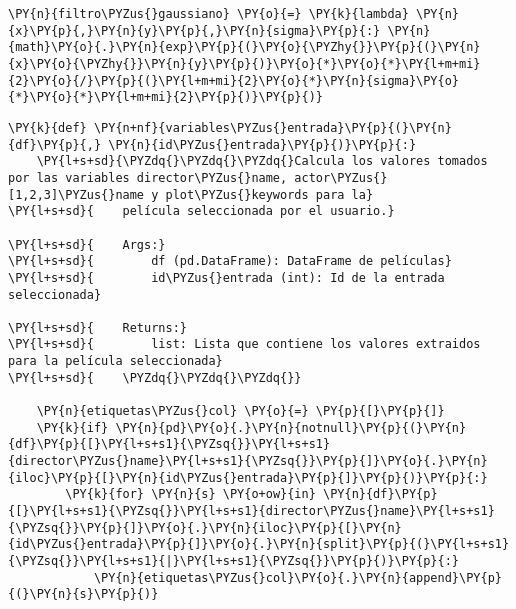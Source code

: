     \begin{tcolorbox}[breakable, size=fbox, boxrule=1pt, pad at break*=1mm,colback=cellbackground, colframe=cellborder]
\begin{Verbatim}[commandchars=\\\{\}]
\PY{n}{filtro\PYZus{}gaussiano} \PY{o}{=} \PY{k}{lambda} \PY{n}{x}\PY{p}{,}\PY{n}{y}\PY{p}{,}\PY{n}{sigma}\PY{p}{:} \PY{n}{math}\PY{o}{.}\PY{n}{exp}\PY{p}{(}\PY{o}{\PYZhy{}}\PY{p}{(}\PY{n}{x}\PY{o}{\PYZhy{}}\PY{n}{y}\PY{p}{)}\PY{o}{*}\PY{o}{*}\PY{l+m+mi}{2}\PY{o}{/}\PY{p}{(}\PY{l+m+mi}{2}\PY{o}{*}\PY{n}{sigma}\PY{o}{*}\PY{o}{*}\PY{l+m+mi}{2}\PY{p}{)}\PY{p}{)}
\end{Verbatim}
\end{tcolorbox}

    \begin{tcolorbox}[breakable, size=fbox, boxrule=1pt, pad at break*=1mm,colback=cellbackground, colframe=cellborder]
\begin{Verbatim}[commandchars=\\\{\}]
\PY{k}{def} \PY{n+nf}{variables\PYZus{}entrada}\PY{p}{(}\PY{n}{df}\PY{p}{,} \PY{n}{id\PYZus{}entrada}\PY{p}{)}\PY{p}{:} 
    \PY{l+s+sd}{\PYZdq{}\PYZdq{}\PYZdq{}Calcula los valores tomados por las variables director\PYZus{}name, actor\PYZus{}[1,2,3]\PYZus{}name y plot\PYZus{}keywords para la}
\PY{l+s+sd}{    película seleccionada por el usuario.}

\PY{l+s+sd}{    Args:}
\PY{l+s+sd}{        df (pd.DataFrame): DataFrame de películas}
\PY{l+s+sd}{        id\PYZus{}entrada (int): Id de la entrada seleccionada}

\PY{l+s+sd}{    Returns:}
\PY{l+s+sd}{        list: Lista que contiene los valores extraidos para la película seleccionada}
\PY{l+s+sd}{    \PYZdq{}\PYZdq{}\PYZdq{}}
    
    \PY{n}{etiquetas\PYZus{}col} \PY{o}{=} \PY{p}{[}\PY{p}{]}    
    \PY{k}{if} \PY{n}{pd}\PY{o}{.}\PY{n}{notnull}\PY{p}{(}\PY{n}{df}\PY{p}{[}\PY{l+s+s1}{\PYZsq{}}\PY{l+s+s1}{director\PYZus{}name}\PY{l+s+s1}{\PYZsq{}}\PY{p}{]}\PY{o}{.}\PY{n}{iloc}\PY{p}{[}\PY{n}{id\PYZus{}entrada}\PY{p}{]}\PY{p}{)}\PY{p}{:}
        \PY{k}{for} \PY{n}{s} \PY{o+ow}{in} \PY{n}{df}\PY{p}{[}\PY{l+s+s1}{\PYZsq{}}\PY{l+s+s1}{director\PYZus{}name}\PY{l+s+s1}{\PYZsq{}}\PY{p}{]}\PY{o}{.}\PY{n}{iloc}\PY{p}{[}\PY{n}{id\PYZus{}entrada}\PY{p}{]}\PY{o}{.}\PY{n}{split}\PY{p}{(}\PY{l+s+s1}{\PYZsq{}}\PY{l+s+s1}{|}\PY{l+s+s1}{\PYZsq{}}\PY{p}{)}\PY{p}{:}
            \PY{n}{etiquetas\PYZus{}col}\PY{o}{.}\PY{n}{append}\PY{p}{(}\PY{n}{s}\PY{p}{)}
            

\end{Verbatim}
\end{tcolorbox}
